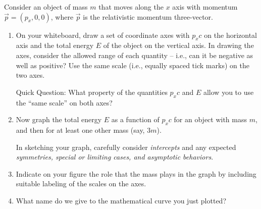 \documentclass[11pt, letterpaper, openany]{book}
\newenvironment{exercise}[1][Exercise]{%
  \tcolorbox[blanker, breakable, left=1em,
    before skip=1em, after skip=1em,
    borderline west={3pt}{0pt}{PhysNavy},
    colback=PhysCream,
    before upper={\textcolor{PhysNavy}{\sffamily\bfseries #1:}\space}
  ]%
}{%
  \endtcolorbox%
}
\begin{document}
\begin{exercise}[Exercise 6]
Consider an object of mass $m$ that moves along the $x$ axis with momentum $\vec{p} = (p_x, 0, 0)$, where $\vec{p}$ is the relativistic momentum three-vector.
\begin{enumerate}[label=(\alph*)]
    \item On your whiteboard, draw a set of coordinate axes with $p_x c$ on the horizontal axis and the total energy $E$ of the object on the vertical axis. In drawing the axes, consider the allowed range of each quantity -- i.e., can it be negative as well as positive? Use the same scale (i.e., equally spaced tick marks) on the two axes.
    
    Quick Question: What property of the quantities $p_x c$ and $E$ allow you to use the ``same scale'' on both axes?
    \item Now graph the total energy $E$ as a function of $p_x c$ for an object with mass $m$, and then for at least one other mass (say, $3m$).
    
    In sketching your graph, carefully consider \textit{intercepts} and any expected \textit{symmetries, special or limiting cases, and asymptotic behaviors}.
    \item Indicate on your figure the role that the mass plays in the graph by including suitable labeling of the scales on the axes.
    \item What name do we give to the mathematical curve you just plotted?
\end{enumerate}
\end{exercise}
\end{document}
